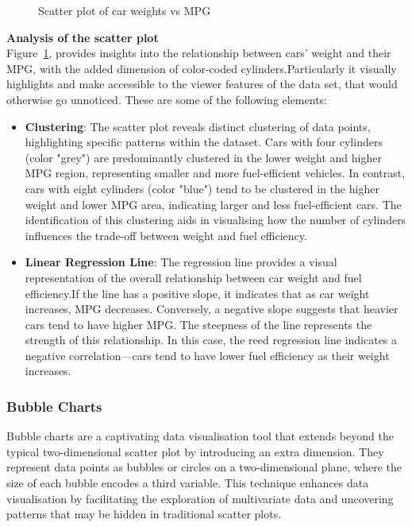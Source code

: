 \documentclass{article}\usepackage[]{graphicx}\usepackage[]{xcolor}
\newenvironment{knitrout}{}{} %
\begin{document}
\begin{knitrout}
\begin{figure}[H]
{}

\caption[Scatter plot of car weights vs MPG]{Scatter plot of car weights vs MPG}\label{fig:scatter-plot}
\end{figure}

\end{knitrout}

\textbf{Analysis of the scatter plot}\\
Figure~\ref{fig:scatter-plot}, provides insights into the relationship between cars' weight and their MPG, with the added dimension of color-coded cylinders.Particularly it visually highlights and make accessible to the viewer features of the data set, that would otherwise go unnoticed. These are some of the following elements: 
\begin{itemize}
    \item \textbf{Clustering}: The scatter plot reveals distinct clustering of data points, highlighting specific patterns within the dataset. Cars with four cylinders (color "grey") are predominantly clustered in the lower weight and higher MPG region, representing smaller and more fuel-efficient vehicles. In contrast, cars with eight cylinders (color "blue") tend to be clustered in the higher weight and lower MPG area, indicating larger and less fuel-efficient cars. The identification of this clustering aids in visualising how the number of cylinders influences the trade-off between weight and fuel efficiency.\\
    \item \textbf{Linear Regression Line}: The regression line provides a visual representation of the overall relationship between car weight and fuel efficiency.If the line has a positive slope, it indicates that as car weight increases, MPG decreases. Conversely, a negative slope suggests that heavier cars tend to have higher MPG. The steepness of the line represents the strength of this relationship. In this case, the reed regression line indicates a negative correlation—cars tend to have lower fuel efficiency as their weight increases.
\end{itemize}

\subsubsection{Bubble Charts}
Bubble charts are a captivating data visualisation tool that extends beyond the typical two-dimensional scatter plot by introducing an extra dimension. They represent data points as bubbles or circles on a two-dimensional plane, where the size of each bubble encodes a third variable. This technique enhances data visualisation by facilitating the exploration of multivariate data and uncovering patterns that may be hidden in traditional scatter plots.\\
\end{document}
